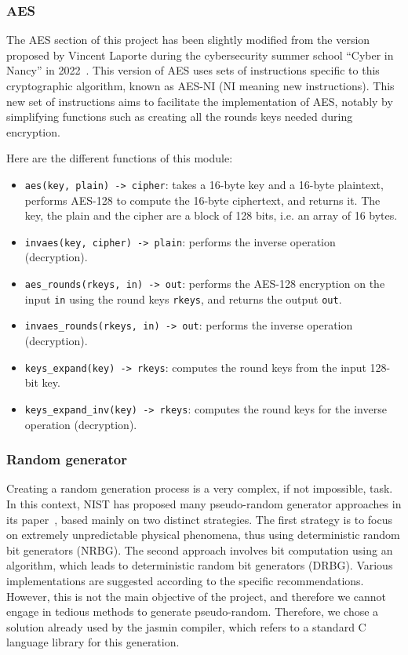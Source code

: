 \documentclass[runningheads]{llncs}
\begin{document}
\subsubsection{AES}
The AES section of this project has been slightly modified from the version proposed by Vincent Laporte during the cybersecurity summer school ``Cyber in Nancy'' in 2022~\cite{cyber_in_nancy}. This version of AES uses sets of instructions specific to this cryptographic algorithm, known as AES-NI (NI meaning new instructions). This new set of instructions aims to facilitate the implementation of AES, notably by simplifying functions such as creating all the rounds keys needed during encryption.

Here are the different functions of this module:
\begin{itemize}
    \item \texttt{aes(key, plain) -> cipher}: takes a 16-byte key and a 16-byte plaintext, performs AES-128 to compute the 16-byte ciphertext, and returns it. The key, the plain and the cipher are a block of 128 bits, i.e. an array of 16 bytes.
    \item \texttt{invaes(key, cipher) -> plain}: performs the inverse operation (decryption).
    \item \texttt{aes\_rounds(rkeys, in) -> out}: performs the AES-128 encryption on the input \texttt{in} using the round keys \texttt{rkeys}, and returns the output \texttt{out}.
    \item \texttt{invaes\_rounds(rkeys, in) -> out}: performs the inverse operation (decryption).
    \item \texttt{keys\_expand(key) -> rkeys}: computes the round keys from the input 128-bit key.
    \item \texttt{keys\_expand\_inv(key) -> rkeys}: computes the round keys for the inverse operation (decryption).
\end{itemize}

\subsubsection{Random generator}

Creating a random generation process is a very complex, if not impossible, task. In this context, NIST has proposed many pseudo-random generator approaches in its paper~\cite{random_generator}, based mainly on two distinct strategies. The first strategy is to focus on extremely unpredictable physical phenomena, thus using deterministic random bit generators (NRBG). The second approach involves bit computation using an algorithm, which leads to deterministic random bit generators (DRBG). Various implementations are suggested according to the specific recommendations. However, this is not the main objective of the project, and therefore we cannot engage in tedious methods to generate pseudo-random. Therefore, we chose a solution already used by the jasmin compiler, which refers to a standard C language library for this generation.
\end{document}
